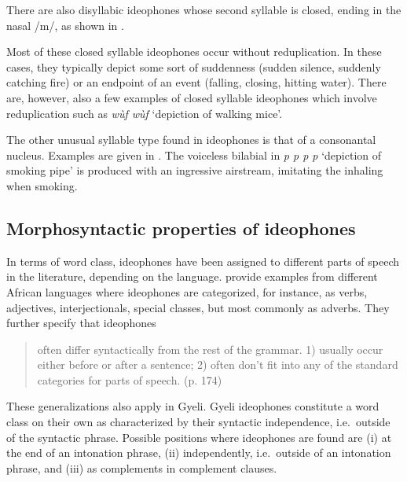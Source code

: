 \noindent There are also disyllabic ideophones whose second syllable is closed, ending in the nasal /m/, as shown in .



Most of these closed syllable ideophones occur without reduplication. In these cases, they typically depict some sort of suddenness  (sudden silence, suddenly catching fire) or an endpoint of an event (falling, closing, hitting water). There are, however, also a few examples of closed syllable ideophones which involve reduplication such as {\itshape wùf wùf} `depiction of walking mice'.

The other unusual syllable type found in ideophones is that of a consonantal nucleus. Examples are given in . The voiceless bilabial in {\itshape p p p p} `depiction of smoking pipe' is produced with an ingressive airstream, imitating the inhaling when smoking.




\subsection{Morphosyntactic properties of ideophones}
\label{sec:IDEOsyn}

In terms of word class, ideophones have been assigned to different parts of speech in the literature, depending on the language. \citet[173]{dwyer2003} provide examples from different African languages where ideophones are categorized, for instance, as verbs, adjectives, interjectionals, special classes, but most commonly as adverbs. They further specify that ideophones
\begin{quote}
often differ syntactically from the rest of the grammar. 1) usually occur either before or after a sentence; 2) often don't fit into any of the standard categories for parts of speech.
(p. 174)
\end{quote}
These generalizations also apply in Gyeli. Gyeli ideophones constitute a word class on their own as characterized by their syntactic independence, i.e.\ outside of the syntactic phrase. Possible positions where ideophones are found are (i) at the end of an intonation phrase, (ii) independently, i.e.\ outside of an intonation phrase, and (iii) as complements in complement clauses.

